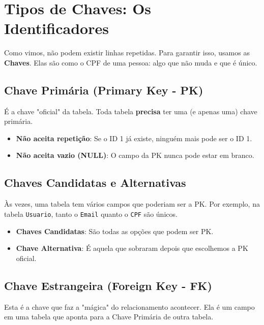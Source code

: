 \section{Tipos de Chaves: Os Identificadores}

Como vimos, não podem existir linhas repetidas. Para garantir isso, usamos as \textbf{Chaves}. Elas são como o CPF de uma pessoa: algo que não muda e que é único.

\subsection{Chave Primária (Primary Key - PK)}

É a chave "oficial" da tabela. Toda tabela \textbf{precisa} ter uma (e apenas uma) chave primária.
\begin{itemize}
    \item \textbf{Não aceita repetição}: Se o ID 1 já existe, ninguém mais pode ser o ID 1.
    \item \textbf{Não aceita vazio (NULL)}: O campo da PK nunca pode estar em branco.
\end{itemize}

\subsection{Chaves Candidatas e Alternativas}

Às vezes, uma tabela tem vários campos que poderiam ser a PK. Por exemplo, na tabela \texttt{Usuario}, tanto o \texttt{Email} quanto o \texttt{CPF} são únicos.
\begin{itemize}
    \item \textbf{Chaves Candidatas}: São todas as opções que podem ser PK.
    \item \textbf{Chave Alternativa}: É aquela que sobraram depois que escolhemos a PK oficial.
\end{itemize}

\subsection{Chave Estrangeira (Foreign Key - FK)}

Esta é a chave que faz a "mágica" do relacionamento acontecer. Ela é um campo em uma tabela que aponta para a Chave Primária de outra  tabela.

